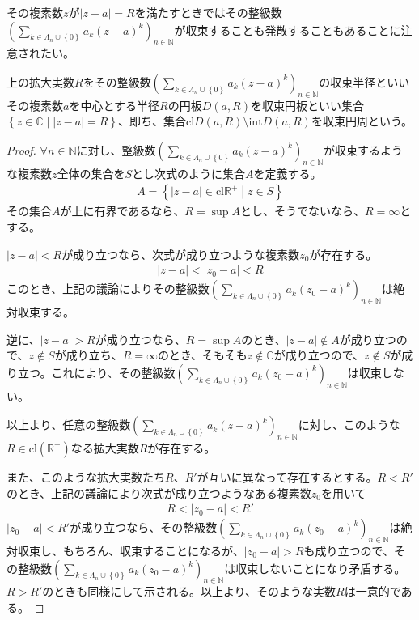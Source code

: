 \documentclass[dvipdfmx]{jsarticle}
\begin{document}
その複素数$z$が$|z - a| = R$を満たすときではその整級数$\left( \sum_{k \in \varLambda_{n} \cup \left\{ 0 \right\}} {a_{k}(z - a)^{k}} \right)_{n \in \mathbb{N}}$が収束することも発散することもあることに注意されたい。
\begin{dfn}
上の拡大実数$R$をその整級数$\left( \sum_{k \in \varLambda_{n} \cup \left\{ 0 \right\}} {a_{k}(z - a)^{k}} \right)_{n \in \mathbb{N}}$の収束半径といいその複素数$a$を中心とする半径$R$の円板$D(a,R)$を収束円板といい集合$\left\{ z \in \mathbb{C} \middle| |z - a| = R \right\}$、即ち、集合$\mathrm{cl}{D(a,R)} \setminus \mathrm{int}{D(a,R)}$を収束円周という。
\end{dfn}
\begin{proof}
$\forall n \in \mathbb{N}$に対し、整級数$\left( \sum_{k \in \varLambda_{n} \cup \left\{ 0 \right\}} {a_{k}(z - a)^{k}} \right)_{n \in \mathbb{N}}$が収束するような複素数$z$全体の集合を$S$とし次式のように集合$A$を定義する。
\begin{align*}
A = \left\{ |z - a| \in \mathrm{cl}\mathbb{R}^{+} \middle| z \in S \right\}
\end{align*}
その集合$A$が上に有界であるなら、$R = \sup A$とし、そうでないなら、$R = \infty$とする。\par
$|z - a| < R$が成り立つなら、次式が成り立つような複素数$z_{0}$が存在する。
\begin{align*}
|z - a| < \left| z_{0} - a \right| < R
\end{align*}
このとき、上記の議論によりその整級数$\left( \sum_{k \in \varLambda_{n} \cup \left\{ 0 \right\}} {a_{k}\left( z_{0} - a \right)^{k}} \right)_{n \in \mathbb{N}}$は絶対収束する。\par
逆に、$|z - a| > R$が成り立つなら、$R = \sup A$のとき、$|z - a| \notin A$が成り立つので、$z \notin S$が成り立ち、$R = \infty$のとき、そもそも$z \notin \mathbb{C}$が成り立つので、$z \notin S$が成り立つ。これにより、その整級数$\left( \sum_{k \in \varLambda_{n} \cup \left\{ 0 \right\}} {a_{k}\left( z_{0} - a \right)^{k}} \right)_{n \in \mathbb{N}}$は収束しない。\par
以上より、任意の整級数$\left( \sum_{k \in \varLambda_{n} \cup \left\{ 0 \right\}} {a_{k}(z - a)^{k}} \right)_{n \in \mathbb{N}}$に対し、このような$R \in \mathrm{cl}\left( \mathbb{R}^{+} \right)$なる拡大実数$R$が存在する。\par
また、このような拡大実数たち$R$、$R'$が互いに異なって存在するとする。$R < R'$のとき、上記の議論により次式が成り立つようなある複素数$z_{0}$を用いて
\begin{align*}
R < \left| z_{0} - a \right| < R'
\end{align*}
$\left| z_{0} - a \right| < R'$が成り立つなら、その整級数$\left( \sum_{k \in \varLambda_{n} \cup \left\{ 0 \right\}} {a_{k}\left( z_{0} - a \right)^{k}} \right)_{n \in \mathbb{N}}$は絶対収束し、もちろん、収束することになるが、$\left| z_{0} - a \right| > R$も成り立つので、その整級数$\left( \sum_{k \in \varLambda_{n} \cup \left\{ 0 \right\}} {a_{k}\left( z_{0} - a \right)^{k}} \right)_{n \in \mathbb{N}}$は収束しないことになり矛盾する。$R > R'$のときも同様にして示される。以上より、そのような実数$R$は一意的である。
\end{proof}
\end{document}
